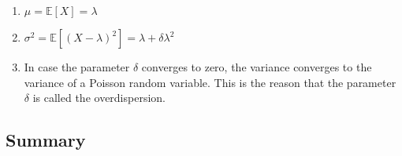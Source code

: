 \begin{enumerate}
    \item $\mu = \mathbb{E}[X] = \lambda$
    \hfill \cite{statistics/book/Statistics-for-Data-Scientists/Maurits-Kaptein}

    \item $\sigma^2 = \mathbb{E}[(X - \lambda)^2] = \lambda + \delta\lambda^2$
    \hfill \cite{statistics/book/Statistics-for-Data-Scientists/Maurits-Kaptein}

    \item In case the parameter $\delta$ converges to zero, the variance converges to the variance of a Poisson random variable.
    This is the reason that the parameter $\delta$ is called the overdispersion.
\end{enumerate}




\subsection{Summary}

